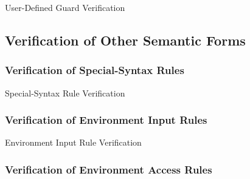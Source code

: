 \begin{algorithm}
\begin{algorithmic}
    \State
\end{algorithmic}
\caption{User-Defined Guard Verification}
\label{alg:user_defined_guard_verification}
\end{algorithm}


\subsection{Verification of Other Semantic Forms} %
\label{sub:verification_of_other_semantic_forms}

\subsubsection{Verification of Special-Syntax Rules} %
\label{ssub:verification_of_special_syntax_rules}

\begin{algorithm}
\begin{algorithmic}
    \State
\end{algorithmic}
\caption{Special-Syntax Rule Verification}
\label{alg:special_syntax_rule_verification}
\end{algorithm}


\subsubsection{Verification of Environment Input Rules} %
\label{ssub:verification_of_environment_input_rules}

\begin{algorithm}
\begin{algorithmic}
    \State
\end{algorithmic}
\caption{Environment Input Rule Verification}
\label{alg:environment_input_rule_verification}
\end{algorithm}


\subsubsection{Verification of Environment Access Rules} %
\label{ssub:verification_of_environment_access_rules}

